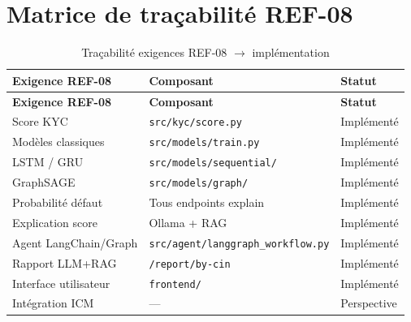 \section{Matrice de traçabilité REF-08}

\begin{longtable}{|p{4cm}|p{4cm}|p{5cm}|}
  \caption{Traçabilité exigences REF-08 $\rightarrow$ implémentation} \\
  \hline
  \textbf{Exigence REF-08} & \textbf{Composant} & \textbf{Statut} \\
  \hline
  \endfirsthead
  \hline
  \textbf{Exigence REF-08} & \textbf{Composant} & \textbf{Statut} \\
  \hline
  \endhead
  Score KYC & \texttt{src/kyc/score.py} & Implémenté \\
  \hline
  Modèles classiques & \texttt{src/models/train.py} & Implémenté \\
  \hline
  LSTM / GRU & \texttt{src/models/sequential/} & Implémenté \\
  \hline
  GraphSAGE & \texttt{src/models/graph/} & Implémenté \\
  \hline
  Probabilité défaut & Tous endpoints explain & Implémenté \\
  \hline
  Explication score & Ollama + RAG & Implémenté \\
  \hline
  Agent LangChain/Graph & \texttt{src/agent/langgraph\_workflow.py} & Implémenté \\
  \hline
  Rapport LLM+RAG & \texttt{/report/by-cin} & Implémenté \\
  \hline
  Interface utilisateur & \texttt{frontend/} & Implémenté \\
  \hline
  Intégration ICM & --- & Perspective \\
  \hline
\end{longtable}
